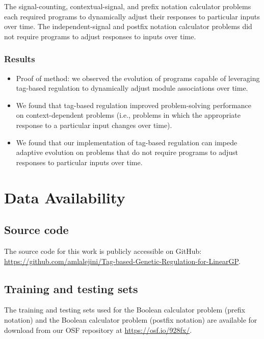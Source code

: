 \documentclass[]{book}
\providecommand{\tightlist}{%
  \setlength{\itemsep}{0pt}\setlength{\parskip}{0pt}}
\begin{document}
The signal-counting, contextual-signal, and prefix notation calculator problems each required programs to dynamically adjust their responses to particular inputs over time.
The independent-signal and postfix notation calculator problems did not require programs to adjust responses to inputs over time.

\hypertarget{results}{%
\subsection{Results}\label{results}}

\begin{itemize}
\tightlist
\item
  Proof of method: we observed the evolution of programs capable of leveraging tag-based regulation to dynamically adjust module associations over time.
\item
  We found that tag-based regulation improved problem-solving performance on context-dependent problems (i.e., problems in which the appropriate response to a particular input changes over time).
\item
  We found that our implementation of tag-based regulation can impede adaptive evolution on problems that do not require programs to adjust responses to particular inputs over time.
\end{itemize}

\hypertarget{data-availability}{%
\chapter{Data Availability}\label{data-availability}}

\hypertarget{source-code}{%
\section{Source code}\label{source-code}}

The source code for this work is publicly accessible on GitHub: \url{https://github.com/amlalejini/Tag-based-Genetic-Regulation-for-LinearGP}.

\hypertarget{training-and-testing-sets}{%
\section{Training and testing sets}\label{training-and-testing-sets}}

The training and testing sets used for the Boolean calculator problem (prefix notation) and the Boolean calculator problem (postfix notation) are available for download from our OSF repository \citep{Lalejini_Moreno_Ofria_Data_2020} at \url{https://osf.io/928fx/}.
\end{document}
